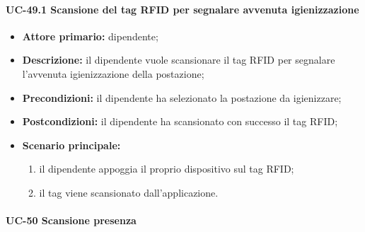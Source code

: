 \paragraph{UC-49.1 Scansione del tag RFID per segnalare avvenuta igienizzazione}
    
    \begin{itemize}
        \item \textbf{Attore primario:} dipendente;

        \item \textbf{Descrizione:} il dipendente vuole scansionare il tag RFID per segnalare l'avvenuta igienizzazione della postazione;

        \item \textbf{Precondizioni:} il dipendente ha selezionato la postazione da igienizzare;

        \item \textbf{Postcondizioni:} il dipendente ha scansionato con successo il tag RFID;

        \item \textbf{Scenario principale:}
            \begin{enumerate}
                \item il dipendente appoggia il proprio dispositivo sul tag RFID;
                \item il tag viene scansionato dall'applicazione.
            \end{enumerate}
    \end{itemize} 

\paragraph{UC-50 Scansione presenza}

